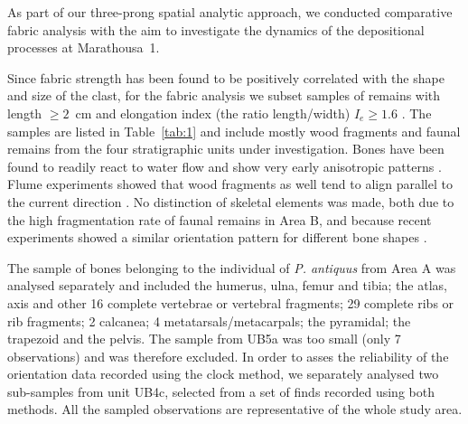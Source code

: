 \documentclass[preprint,authoryear,times]{elsarticle} %
\begin{document}
As part of our three-prong spatial analytic approach, we conducted comparative fabric analysis with the aim to investigate the dynamics of the depositional processes at Marathousa~1.

Since fabric strength has been found to be positively correlated with the shape and size of the clast, for the fabric analysis we subset samples of remains with length $\geq2$~cm and elongation index (the ratio length/width) $I_{e}\geq1.6$ \citep{Lenoble2004}. The samples are listed in Table~\ref{tab:1} and include mostly wood fragments and faunal remains from the four stratigraphic units under investigation. Bones have been found to readily react to water flow and show very early anisotropic patterns \citep{Dominguez-Rodrigo2014}. Flume experiments showed that wood fragments as well tend to align parallel to the current direction \citep{Macdonald1985}. No distinction of skeletal elements was made, both due to the high fragmentation rate of faunal remains in Area B, and because recent experiments showed a similar orientation pattern for different bone shapes \citep{Dominguez-Rodrigo2012,Dominguez-Rodrigo2013}. %

The sample of bones belonging to the individual of \emph{P. antiquus} from Area A was analysed separately and included the humerus, ulna, femur and tibia; the atlas, axis and other 16 complete vertebrae or vertebral fragments; 29 complete ribs or rib fragments; 2 calcanea; 4 metatarsals/metacarpals; the pyramidal; the trapezoid and the pelvis. The sample from UB5a was too small (only 7 observations) and was therefore excluded. In order to asses the reliability of the orientation data recorded using the clock method, we separately analysed two sub-samples from unit UB4c, selected from a set of finds recorded using both methods. All the sampled observations are representative of the whole study area.

\begin{table}[]
  \caption{List of sampled observations for the fabric analysis.}
  \label{tab:1}
  \vspace{0.1in}
\end{table}
\end{document}
